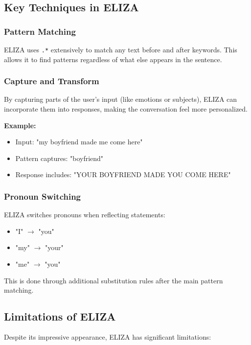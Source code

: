 \documentclass[11pt,a4paper]{article}
\theoremstyle{definition}
\theoremstyle{plain}
\theoremstyle{remark}
\begin{document}
\subsection{Key Techniques in ELIZA}

\subsubsection{Pattern Matching}

ELIZA uses \texttt{.*} extensively to match any text before and after keywords. This allows it to find patterns regardless of what else appears in the sentence.

\subsubsection{Capture and Transform}

By capturing parts of the user's input (like emotions or subjects), ELIZA can incorporate them into responses, making the conversation feel more personalized.

\textbf{Example:}
\begin{itemize}
    \item Input: "my boyfriend made me come here"
    \item Pattern captures: "boyfriend"
    \item Response includes: "YOUR BOYFRIEND MADE YOU COME HERE"
\end{itemize}

\subsubsection{Pronoun Switching}

ELIZA switches pronouns when reflecting statements:
\begin{itemize}
    \item "I" $\rightarrow$ "you"
    \item "my" $\rightarrow$ "your"
    \item "me" $\rightarrow$ "you"
\end{itemize}

This is done through additional substitution rules after the main pattern matching.

\subsection{Limitations of ELIZA}

Despite its impressive appearance, ELIZA has significant limitations:
\end{document}
